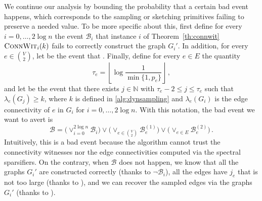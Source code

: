 \documentclass[epsfig,letter,11pt]{article}
\numberwithin{equation}{section}
\renewcommand{\tilde}{\widetilde}
\begin{document}
\noindent
We continue our analysis by bounding the probability that a certain bad event happens, which corresponds to the sampling or sketching primitives failing to preserve a needed value. To be more specific about this, first define for every $i =0, \dots, 2\log n$ the event $\mathcal{B}_i$ that instance $i$ of Theorem~\ref{th:connwit} $\textsc{ConnWit}_i(k)$ fails to correctly construct the graph $G_i'$. In addition, for every $e \in \binom{V}{2}$, let  be the event that \smash{$\tilde{\lambda}_e < 1/2 \cdot \lambda_e$ or $\tilde{\lambda}_e > 3/2 \cdot \lambda_e$}. Finally, define for every $e \in E$ the quantity
\begin{equation*}
	\tau_e = \left\lfloor \log \frac{1}{\min\{1, p_e\}}\right\rfloor \, ,
\end{equation*} and let  be the event that there exists $j  \in \mathbb{N}$ with $\tau_e-2 \le j \le \tau_e$ such that $\lambda_e(G_{j}) \ge k$, where $k$ is defined in \cref{alg:dynsampling} and $\lambda_e(G_i)$ is the edge connectivity of $e$ in $G_i$ for $i=0,\dots,2\log n$. With this notation, the bad event we want to avert is
\begin{equation*}
	\mathcal{B} = \Big(\vee_{i=0}^{2 \log n} \mathcal{B}_i\Big) \vee \Big(\vee_{e \in \binom{V}{2}} \mathcal{B}^{(1)}_e\Big) \vee \Big(\vee_{e \in E} \mathcal{B}^{(2)}_e\Big) \, .
\end{equation*}
Intuitively, this is a bad event because the algorithm cannot trust the connectivity witnesses nor the edge connectivities computed via the spectral sparsifiers. On the contrary, when $\mathcal{B}$ does not happen, we know that all the graphs $G_i'$ are constructed correctly (thanks to $\neg  \mathcal{B}_i$), all the edges have $j_e$ that is not too large (thanks to ), and we can recover the sampled edges via the graphs~$G_i'$ (thanks to ).
\end{document}

